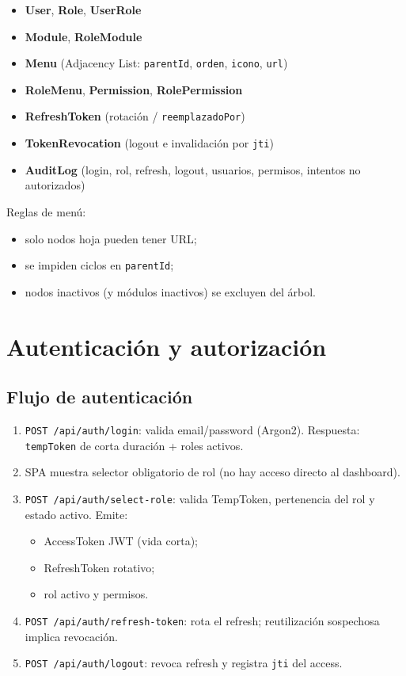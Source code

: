 \documentclass[12pt,a4paper]{article}
\begin{document}
\begin{itemize}[leftmargin=1.5em]
  \item \textbf{User}, \textbf{Role}, \textbf{UserRole}
  \item \textbf{Module}, \textbf{RoleModule}
  \item \textbf{Menu} (Adjacency List: \texttt{parentId}, \texttt{orden}, \texttt{icono}, \texttt{url})
  \item \textbf{RoleMenu}, \textbf{Permission}, \textbf{RolePermission}
  \item \textbf{RefreshToken} (rotación / \texttt{reemplazadoPor})
  \item \textbf{TokenRevocation} (logout e invalidación por \texttt{jti})
  \item \textbf{AuditLog} (login, rol, refresh, logout, usuarios, permisos, intentos no autorizados)
\end{itemize}

Reglas de menú:
\begin{itemize}[leftmargin=1.5em]
  \item solo nodos hoja pueden tener URL;
  \item se impiden ciclos en \texttt{parentId};
  \item nodos inactivos (y módulos inactivos) se excluyen del árbol.
\end{itemize}

\section{Autenticación y autorización}
\subsection{Flujo de autenticación}
\begin{enumerate}[leftmargin=1.5em]
  \item \texttt{POST /api/auth/login}: valida email/password (Argon2).
        Respuesta: \texttt{tempToken} de corta duración + roles activos.
  \item SPA muestra selector obligatorio de rol (no hay acceso directo al dashboard).
  \item \texttt{POST /api/auth/select-role}: valida TempToken, pertenencia del rol
        y estado activo. Emite:
        \begin{itemize}
          \item AccessToken JWT (vida corta);
          \item RefreshToken rotativo;
          \item rol activo y permisos.
        \end{itemize}
  \item \texttt{POST /api/auth/refresh-token}: rota el refresh; reutilización sospechosa
        implica revocación.
  \item \texttt{POST /api/auth/logout}: revoca refresh y registra \texttt{jti} del access.
\end{enumerate}
\end{document}
